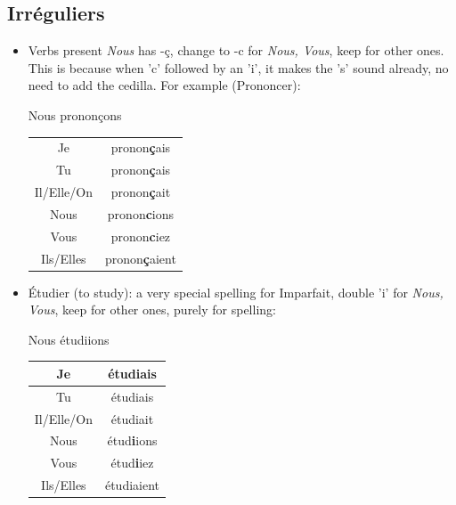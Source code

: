 \documentclass{book}
\begin{document}
\subsection{Irréguliers}
\begin{itemize}
    \item Verbs present \textit{Nous} has -ç, change to -c for \textit{Nous, Vous}, keep for other ones. This is because when 'c' followed by an 'i', it makes the 's' sound already, no need to add the cedilla.
    For example (Prononcer):
    \begin{center}
        Nous prononçons \\
        \begin{tabular}{|c|c|}
            \hline
            Je & pronon\textbf{ç}ais \\
            Tu & pronon\textbf{ç}ais \\
            Il/Elle/On & pronon\textbf{ç}ait \\
            Nous & pronon\textbf{c}ions \\
            Vous & pronon\textbf{c}iez \\
            Ils/Elles & pronon\textbf{ç}aient \\
            \hline
        \end{tabular}
    \end{center}

    \item Étudier (to study): a very special spelling for Imparfait, double 'i' for \textit{Nous, Vous}, keep for other ones, purely for spelling:
    \begin{center}
        Nous étudiions \\
        \begin{tabular}{|c|c|}
            \hline
            Je & étudiais \\
            \hline
            Tu & étudiais \\
            \hline
            Il/Elle/On & étudiait \\
            \hline
            Nous & étud\textbf{i}ions \\
            \hline
            Vous & étud\textbf{i}iez \\
            \hline
            Ils/Elles & étudiaient \\
            \hline
        \end{tabular}
    \end{center}


\end{itemize}
\end{document}
